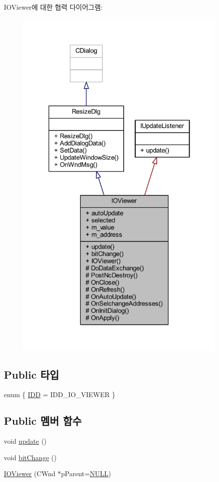 I\+O\+Viewer에 대한 협력 다이어그램\+:\nopagebreak
\begin{figure}[H]
\begin{center}
\leavevmode
\includegraphics[width=298pt]{class_i_o_viewer__coll__graph}
\end{center}
\end{figure}
\subsection*{Public 타입}
\begin{DoxyCompactItemize}
\item 
enum \{ \mbox{\hyperlink{class_i_o_viewer_ae3a0a931b85052266f471555982f4467a7633883737de956634100664f047c319}{I\+DD}} = I\+D\+D\+\_\+\+I\+O\+\_\+\+V\+I\+E\+W\+ER
 \}
\end{DoxyCompactItemize}
\subsection*{Public 멤버 함수}
\begin{DoxyCompactItemize}
\item 
void \mbox{\hyperlink{class_i_o_viewer_a500c8fc593280ff95977fb59293b6ab6}{update}} ()
\item 
void \mbox{\hyperlink{class_i_o_viewer_af0c313447ad43d835f1eeca938bfd759}{bit\+Change}} ()
\item 
\mbox{\hyperlink{class_i_o_viewer_a0a407ba2dca2ad056507e2ed888d6fc3}{I\+O\+Viewer}} (C\+Wnd $\ast$p\+Parent=\mbox{\hyperlink{_system_8h_a070d2ce7b6bb7e5c05602aa8c308d0c4}{N\+U\+LL}})
\end{DoxyCompactItemize}

